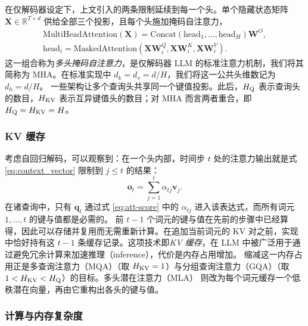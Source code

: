 \documentclass[11pt]{article}
\newcommand{\R}{\mathbb{R}}
\newcommand{\mat}[1]{\mathbf{#1}}
\newcommand{\vecb}[1]{\mathbf{#1}}
\begin{document}
在仅解码器设定下，上文引入的两条限制延续到每一个头。单个隐藏状态矩阵 $\mat{X} \in \R^{T \times d}$ 供给全部三个投影，且每个头施加掩码自注意力，
\begin{equation}
\label{eq:mha-decoder}
\begin{gathered}
\text{MultiHeadAttention}(\mat{X}) = \text{Concat}(\text{head}_1, \dots, \text{head}_H) \mat{W}^O, \\
\text{head}_i = \text{MaskedAttention}(\mat{X}\mat{W}_i^Q, \mat{X} \mat{W}_i^K, \mat{X} \mat{W}_i^V).
\end{gathered}
\end{equation}
这一组合称为\emph{多头掩码自注意力}，是仅解码器 LLM 的标准注意力机制，我们将其简称为 MHA。在标准实现中 $d_k = d_v = d/H$，我们将这一公共头维数记为 $d_h = d/H$。
一些架构让多个查询头共享同一个键值投影。此后，$H_{\rm Q}$ 表示查询头的数目，$H_{\rm KV}$ 表示互异键值头的数目；对 MHA 而言两者重合，即 $H_{\rm Q} = H_{\rm KV} = H$。

\subsubsection{KV 缓存}

考虑自回归解码，可以观察到：在一个头内部，时间步 $t$ 处的注意力输出就是式 \eqref{eq:context_vector} 限制到 $j \le t$ 的结果：
\begin{equation}
\label{eq:kv-output}
\vecb{o}_t = \sum_{j=1}^{t} \alpha_{tj} \vecb{v}_j .
\end{equation}
在诸查询中，只有 $\vecb{q}_t$ 通过式 \eqref{eq:att-score} 中的 $\alpha_{tj}$ 进入该表达式，而所有词元 $1, \ldots, t$ 的键与值都是必需的。
前 $t-1$ 个词元的键与值在先前的步骤中已经算得，因此可以存储并复用而无需重新计算。在追加当前词元的 KV 对之前，实现中恰好持有这 $t-1$ 条缓存记录。这项技术即\textit{KV 缓存}，在 LLM 中被广泛用于通过避免冗余计算来加速推理（inference），代价是内存占用增加。
缩减这一内存占用正是多查询注意力（MQA）\cite{shazeer2019mqa}（取 $H_{\rm KV} = 1$）与分组查询注意力（GQA）\cite{ainslie2023gqa}（取 $1 < H_{\rm KV} < H_{\rm Q}$）的目标。多头潜在注意力（MLA）\cite{deepseekai2024deepseekv2} 则改为每个词元缓存一个低秩潜在向量，再由它重构出各头的键与值。


\subsubsection{计算与内存复杂度}
\end{document}
